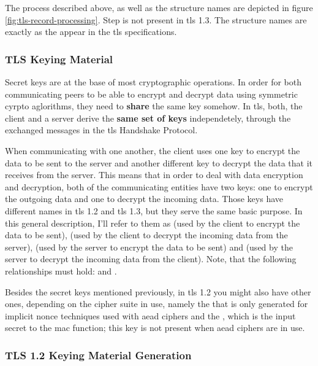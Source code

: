 \documentclass{llncs}
\begin{document}
The process described above, as well as the structure names are depicted in figure \ref{fig:tls-record-processing}.
Step  is not present in \gls{tls} 1.3. The structure names are exactly as the appear in the \gls{tls} specifications.

\subsubsection{TLS Keying Material}

Secret keys are at the base of most cryptographic operations.
In order for both communicating peers to be able to encrypt and decrypt data
using symmetric cyrpto aglorithms, they need to \textbf{share} the same key
somehow. In \gls{tls}, both, the client and a server derive the \textbf{same set of keys}
independetely, through the exchanged messages in the \gls{tls} Handshake Protocol.

When communicating with one another, the client uses one key to
encrypt the data to be sent to the server and another different key to decrypt the data
that it receives from the server. This means that in order to deal with data
encryption and decryption, both of the communicating entities have two keys:
one to encrypt the outgoing data and one to decrypt the incoming data. Those keys
have different names in \gls{tls} 1.2 and \gls{tls} 1.3, but they serve the same
basic purpose. In this general description, I'll refer to them as 
(used by the client to encrypt the data to be sent), (used by the client to
decrypt the incoming data from the server), (used by the server to encrypt
the data to be sent) and (used by the server to decrypt the incoming
data from the client). Note, that the following relationships must hold:
 and .

Besides the secret keys mentioned previously, in \gls{tls} 1.2 you might also have other ones,
depending on the cipher suite in use, namely the  that
is only generated for implicit nonce techniques used with \gls{aead} ciphers and the
, which is the input secret to the \gls{mac}
function; this key is not present when \gls{aead} ciphers are in use.

\subsubsection{TLS 1.2 Keying Material Generation}
\end{document}
